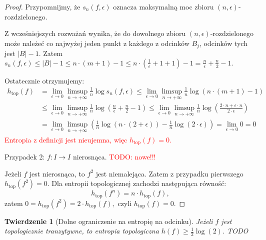 \documentclass[licencjacka]{pwr_wmat_praca_dyplomowa}
\theoremstyle{plain}
\newtheorem{theorem}{Twierdzenie}
\numberwithin{theorem}{chapter}
\theoremstyle{definition}
\numberwithin{theorem}{chapter}
\begin{document}
\begin{proof}
Przypomnijmy, że $s_n(f, \epsilon)$ oznacza maksymalną moc zbioru $(n, \epsilon)$-rozdzielonego. 


Z wcześniejszych rozważań wynika, że do dowolnego zbioru $(n, \epsilon)$-rozdzielonego może należeć co najwyżej jeden punkt z każdego z odcinków $B_j$, odcinków tych jest $|B|-1.$ Zatem $s_n(f, \epsilon) \leq |B|-1 \leq n \cdot (m+1) - 1 \leq n \cdot (\frac{1}{\epsilon}+1+1) - 1 = \frac{n}{\epsilon} + \frac{n}{2} - 1.$



Ostatecznie otrzymujemy:
\begin{equation}
\begin{aligned}
h_{\textrm{top}}(f) & = \lim_{\epsilon \rightarrow 0} \limsup_{n \rightarrow +\infty} \frac{1}{n} \log s_n(f, \epsilon) \leq \lim_{\epsilon \rightarrow 0} \limsup_{n \rightarrow +\infty} \frac{1}{n} \log ( n \cdot (m+1) - 1 ) \\
& \leq \lim_{\epsilon \rightarrow 0} \limsup_{n \rightarrow +\infty} \frac{1}{n} \log ( \frac{n}{\epsilon} + \frac{n}{2} - 1 ) \leq \lim_{\epsilon \rightarrow 0} \limsup_{n \rightarrow +\infty} \frac{1}{n} \log ( \frac{2 \cdot n + \epsilon \cdot n}{2 \cdot \epsilon}) \\
& = \lim_{\epsilon \rightarrow 0} \limsup_{n \rightarrow +\infty} (\frac{1}{n} \log (n \cdot (2 + \epsilon)) - \frac{1}{n} \log ( 2 \cdot \epsilon )) = \lim_{\epsilon \rightarrow 0} 0 = 0
\end{aligned}
\end{equation}
\textcolor{red}{
Entropia z definicji jest nieujemna, więc $h_{\textrm{top}}(f) = 0.$
}

\item[Przypadek 2: $f: I \rightarrow I$ nierosnąca.]
\textcolor{red}{TODO: nowe!!!}

Jeżeli $f$ jest nierosnąca, to $f^2$ jest niemalejąca. Zatem z przypadku pierwszego $h_{\textrm{top}}(f^2) = 0$. Dla entropii topologicznej zachodzi następująca równość: 
$$h_{\textrm{top}}(f^n) = n \cdot h_{\textrm{top}}(f),$$
zatem 
$0 = h_{\textrm{top}}(f^2) = 2 \cdot h_{\textrm{top}}(f),$
czyli
$h_{\textrm{top}}(f) = 0.$

\end{proof}
 
 
 
 
\begin{theorem}[Dolne ograniczenie na entropię na odcinku] \label{dolne_ograniczenie_entropii_na_odcinku}
\cite{ruette2017chaos}
Jeżeli $f$ jest topologicznie tranzytywne, to entropia topologiczna $h(f) \geq \frac{1}{2} \log(2)$.
TODO
\end{theorem}
\end{document}
